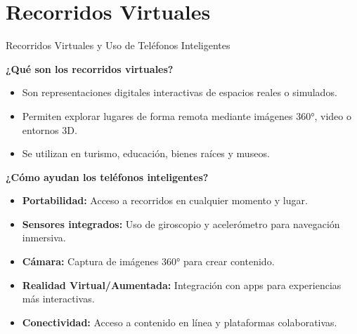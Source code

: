 \documentclass[aspectratio=169,compress]{beamer}
\begin{document}






\section[PRV]{Recorridos Virtuales}

\begin{frame}{Recorridos Virtuales y Uso de Teléfonos Inteligentes}

\textbf{¿Qué son los recorridos virtuales?}
\begin{itemize}
    \item Son representaciones digitales interactivas de espacios reales o simulados.
    \item Permiten explorar lugares de forma remota mediante imágenes 360°, video o entornos 3D.
    \item Se utilizan en turismo, educación, bienes raíces y museos.
\end{itemize}

\vspace{0.5cm}

\textbf{¿Cómo ayudan los teléfonos inteligentes?}
\begin{itemize}
    \item \textbf{Portabilidad:} Acceso a recorridos en cualquier momento y lugar.
    \item \textbf{Sensores integrados:} Uso de giroscopio y acelerómetro para navegación inmersiva.
    \item \textbf{Cámara:} Captura de imágenes 360° para crear contenido.
    \item \textbf{Realidad Virtual/Aumentada:} Integración con apps para experiencias más interactivas.
    \item \textbf{Conectividad:} Acceso a contenido en línea y plataformas colaborativas.
\end{itemize}

\end{frame}
\end{document}

